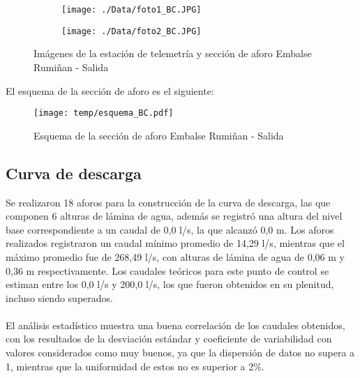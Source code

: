\documentclass[]{article}
\begin{document}
\begin{figure}[H]
  \centering
\begin{subfigure}{.49\textwidth}
  \texttt{[image: ./Data/foto1\_BC.JPG]}
\end{subfigure}
\hfill
\begin{subfigure}{.49\textwidth}
  \texttt{[image: ./Data/foto2\_BC.JPG]}
\end{subfigure}
\caption{Imágenes de la estación de telemetría y sección de aforo Embalse Rumiñan - Salida }
\label{fig:fotos_29}
\end{figure}

El esquema de la sección de aforo es el siguiente:

\begin{figure}[H]
  \centering
  \texttt{[image: temp/esquema\_BC.pdf]}
\caption{Esquema de la sección de aforo Embalse Rumiñan - Salida }
\label{fig:Esquema_BC}
\end{figure}

\subsection{Curva de descarga}\label{curva-de-descarga-28}

Se realizaron 18 aforos para la construcción de la curva de descarga, las que componen 6 alturas de lámina de agua, además se registró una altura del nivel base correspondiente a un caudal de 0,0 l/s, la que alcanzó 0,0 m. Los aforos realizados registraron un caudal mínimo promedio de 14,29 l/s, mientras que el máximo promedio fue de 268,49 l/s, con alturas de lámina de agua de 0,06 m y 0,36 m respectivamente. Los caudales teóricos para este punto de control se estiman entre los 0,0 l/s y 200,0 l/s, los que fueron obtenidos en su plenitud, incluso siendo superados.\\
\\
El análisis estadístico muestra una buena correlación de los caudales obtenidos, con los resultados de la desviación estándar y coeficiente de variabilidad con valores considerados como muy buenos, ya que la dispersión de datos no supera a 1, mientras que la uniformidad de estos no es superior a 2\%.
\end{document}

